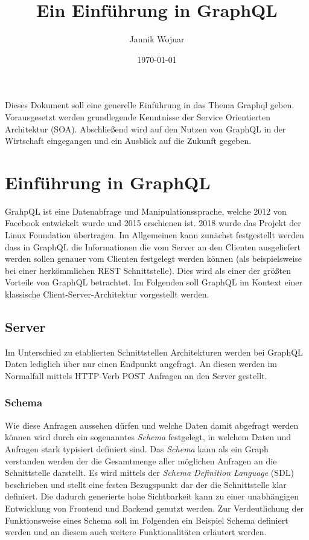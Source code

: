 \documentclass[11pt]{article}
\title{Ein Einführung in GraphQL}
\author{Jannik Wojnar}
\date{\today}
\begin{document}
\maketitle
\paragraph{}
Dieses Dokument soll eine generelle Einführung in das Thema Graphql geben. Vorausgesetzt werden grundlegende Kenntnisse der Service Orientierten Architektur (SOA). Abschließend wird auf den Nutzen von GraphQL in der Wirtschaft eingegangen und ein Ausblick auf die Zukunft gegeben.

\tableofcontents
\newpage

\section{Einführung in GraphQL}
GrahpQL ist eine Datenabfrage und Manipulationssprache, welche 2012 von Facebook entwickelt wurde und 2015 erschienen ist. 2018 wurde  das Projekt der Linux Foundation übertragen.
Im Allgemeinen kann zunächst festgestellt werden dass in GraphQL die Informationen die vom Server an den Clienten ausgeliefert werden sollen genauer vom Clienten festgelegt werden können (als beispielsweise bei einer herkömmlichen REST Schnittstelle). Dies wird als einer der größten Vorteile von GraphQL betrachtet.
Im Folgenden soll GraphQL im Kontext einer klassische Client-Server-Architektur vorgestellt werden.

\subsection{Server}
Im Unterschied zu etablierten Schnittstellen Architekturen werden bei GraphQL Daten lediglich über nur einen Endpunkt angefragt. An diesen werden im Normalfall mittels HTTP-Verb POST Anfragen an den Server gestellt.

\subsubsection{Schema}
Wie diese Anfragen aussehen dürfen und welche Daten damit abgefragt werden können wird durch ein sogenanntes \textit{Schema} festgelegt, in welchem Daten und Anfragen stark typisiert definiert sind.
Das \textit{Schema} kann als ein Graph verstanden werden der die Gesamtmenge aller möglichen Anfragen an die Schnittstelle darstellt. Es wird mittels der \textit{Schema Definition Language} (SDL) beschrieben und stellt eine festen Bezugspunkt dar der die Schnittstelle klar definiert. Die dadurch generierte hohe Sichtbarkeit kann zu einer unabhängigen Entwicklung von Frontend und Backend genutzt werden.
 Zur Verdeutlichung der Funktionsweise eines Schema soll im Folgenden ein Beispiel Schema definiert werden und an diesem auch weitere Funktionalitäten erläutert werden.
 
\end{document}
